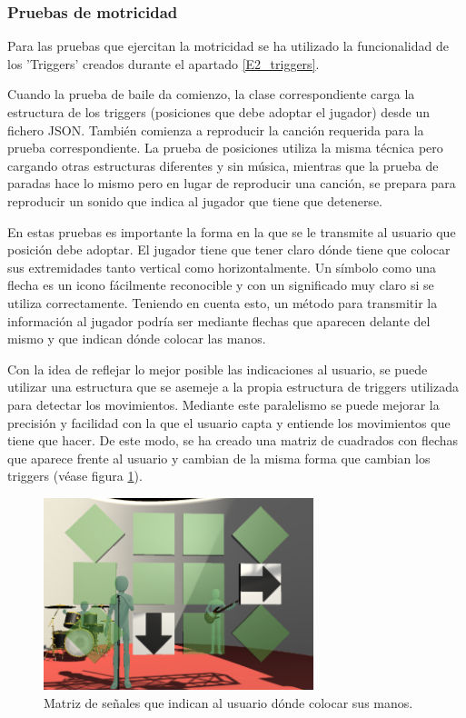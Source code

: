 \subsubsection{Pruebas de motricidad}

Para las pruebas que ejercitan la motricidad se ha utilizado la funcionalidad de los 'Triggers' creados durante el apartado \ref{E2_triggers}.

Cuando la prueba de baile da comienzo, la clase correspondiente carga la estructura de los triggers (posiciones que debe adoptar el jugador) desde un fichero JSON. También comienza a reproducir la canción requerida para la prueba correspondiente. La prueba de posiciones utiliza la misma técnica pero cargando otras estructuras diferentes y sin música, mientras que la prueba de paradas hace lo mismo pero en lugar de reproducir una canción, se prepara para reproducir un sonido que indica al jugador que tiene que detenerse.

En estas pruebas es importante la forma en la que se le transmite al usuario que posición debe adoptar. El jugador tiene que tener claro dónde tiene que colocar sus extremidades tanto vertical como horizontalmente. Un símbolo como una flecha es un icono fácilmente reconocible y con un significado muy claro si se utiliza correctamente. Teniendo en cuenta esto, un método para transmitir la información al jugador podría ser mediante flechas que aparecen delante del mismo y que indican dónde colocar las manos.

Con la idea de reflejar lo mejor posible las indicaciones al usuario, se puede utilizar una estructura que se asemeje a la propia estructura de triggers utilizada para detectar los movimientos. Mediante este paralelismo se puede mejorar la precisión y facilidad con la que el usuario capta y entiende los movimientos que tiene que hacer. De este modo, se ha creado una matriz de cuadrados con flechas que aparece frente al usuario y cambian de la misma forma que cambian los triggers (véase figura \ref{fig:E4_posiciones}).

\begin{figure}
  \centering
    \includegraphics[width=0.7\textwidth]{04.Desarrollo/04.Entrega4/02.Iteracion4_2/00.Figuras/03.posiciones.png}
    \caption{Matriz de señales que indican al usuario dónde colocar sus manos.}
    \label{fig:E4_posiciones}
\end{figure}


